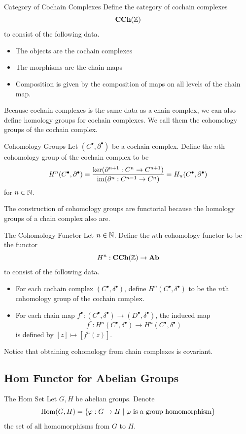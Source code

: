 \documentclass[a4paper]{article}
\begin{document}
\begin{defn}{Category of Cochain Complexes}{} Define the category of cochain complexes $$\bold{CCh}(\mathbb{Z})$$ to consist of the following data. 
\begin{itemize}
\item The objects are the cochain complexes
\item The morphisms are the chain maps
\item Composition is given by the composition of maps on all levels of the chain map. 
\end{itemize}
\end{defn}

Because cochain complexes is the same data as a chain complex, we can also define homology groups for cochain complexes. We call them the cohomology groups of the cochain complex. 

\begin{defn}{Cohomology Groups}{} Let $(C^\bullet,\partial^\bullet)$ be a cochain complex. Define the $n$th cohomology group of the cochain complex to be $$H^n(C^\bullet,\partial^\bullet)=\frac{\ker(\partial^{n+1}:C^n\to C^{n+1})}{\operatorname{im}(\partial^n:C^{n-1}\to C^n)}=H_n(C^\bullet,\partial^\bullet)$$ for $n\in\mathbb{N}$. 
\end{defn}

The construction of cohomology groups are functorial because the homology groups of a chain complex also are. 

\begin{defn}{The Cohomology Functor}{} Let $n\in\mathbb{N}$. Define the $n$th cohomology functor to be the functor $$H^n:\bold{CCh}(\mathbb{Z})\to\bold{Ab}$$ to consist of the following data. 
\begin{itemize}
\item For each cochain complex $(C^\bullet,\delta^\bullet)$, define $H^n(C^\bullet,\delta^\bullet)$ to be the $n$th cohomology group of the cochain complex. 
\item For each chain map $f^\bullet:(C^\bullet,\delta^\bullet)\to(D^\bullet,\delta^\bullet)$, the induced map $$f^\ast:H^n(C^\bullet,\delta^\bullet)\to H^n(C^\bullet,\delta^\bullet)$$ is defined by $[z]\mapsto[f^n(z)]$. 
\end{itemize}
\end{defn}

Notice that obtaining cohomology from chain complexes is covariant. 

\subsection{Hom Functor for Abelian Groups}
\begin{defn}{The Hom Set}{} Let $G,H$ be abelian groups. Denote $$\operatorname{Hom}(G,H)=\{\varphi:G\to H\;|\;\varphi\text{ is a group homomorphism}\}$$ the set of all homomorphisms from $G$ to $H$. 
\end{defn}
\end{document}
